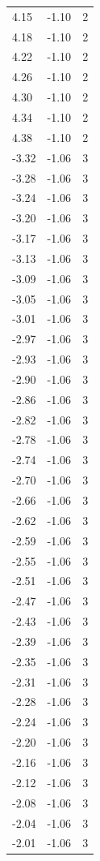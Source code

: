 \begin{longtable}{lrr}
  4.15 & -1.10 & 2 \\
  4.18 & -1.10 & 2 \\
  4.22 & -1.10 & 2 \\
  4.26 & -1.10 & 2 \\
  4.30 & -1.10 & 2 \\
  4.34 & -1.10 & 2 \\
  4.38 & -1.10 & 2 \\
  -3.32 & -1.06 & 3 \\
  -3.28 & -1.06 & 3 \\
  -3.24 & -1.06 & 3 \\
  -3.20 & -1.06 & 3 \\
  -3.17 & -1.06 & 3 \\
  -3.13 & -1.06 & 3 \\
  -3.09 & -1.06 & 3 \\
  -3.05 & -1.06 & 3 \\
  -3.01 & -1.06 & 3 \\
  -2.97 & -1.06 & 3 \\
  -2.93 & -1.06 & 3 \\
  -2.90 & -1.06 & 3 \\
  -2.86 & -1.06 & 3 \\
  -2.82 & -1.06 & 3 \\
  -2.78 & -1.06 & 3 \\
  -2.74 & -1.06 & 3 \\
  -2.70 & -1.06 & 3 \\
  -2.66 & -1.06 & 3 \\
  -2.62 & -1.06 & 3 \\
  -2.59 & -1.06 & 3 \\
  -2.55 & -1.06 & 3 \\
  -2.51 & -1.06 & 3 \\
  -2.47 & -1.06 & 3 \\
  -2.43 & -1.06 & 3 \\
  -2.39 & -1.06 & 3 \\
  -2.35 & -1.06 & 3 \\
  -2.31 & -1.06 & 3 \\
  -2.28 & -1.06 & 3 \\
  -2.24 & -1.06 & 3 \\
  -2.20 & -1.06 & 3 \\
  -2.16 & -1.06 & 3 \\
  -2.12 & -1.06 & 3 \\
  -2.08 & -1.06 & 3 \\
  -2.04 & -1.06 & 3 \\
  -2.01 & -1.06 & 3 \\

\end{longtable}
